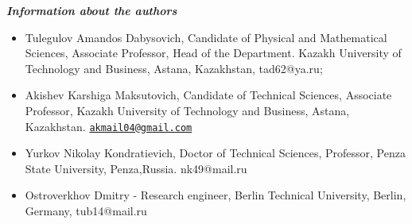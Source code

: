 \emph{{\bfseries Information about the authors}}

\begin{itemize}
\item
Tulegulov Amandos Dabysovich, Candidate of Physical and Mathematical
Sciences, Associate Professor, Head of the Department. Kazakh University
of Technology and Business, Astana, Kazakhstan, tad62@ya.ru;

\item
Akishev Karshiga Maksutovich, Candidate of Technical Sciences, Associate
Professor, Kazakh University of Technology and Business, Astana,
Kazakhstan.
\href{mailto:akmail04@gmail.com}{\nolinkurl{akmail04@gmail.com}}

\item
Yurkov Nikolay Kondratievich, Doctor of Technical Sciences, Professor,
Penza State University, Penza,Russia. nk49@mail.ru

\item
Ostroverkhov Dmitry - Research engineer, Berlin Technical University,
Berlin, Germany, tub14@mail.ru
\end{itemize}
